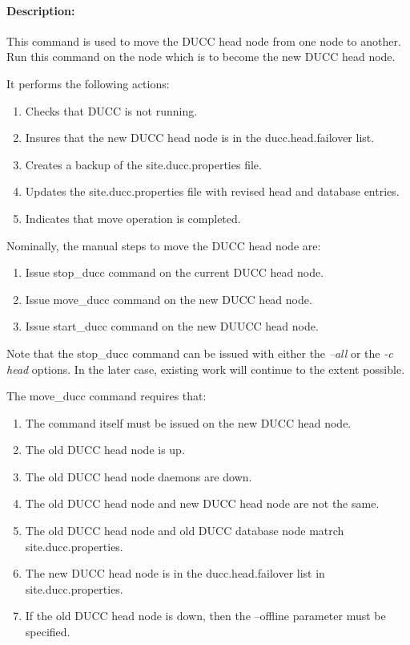     \paragraph{Description:}
        This command is used to move the DUCC head node from one node to another.
        Run this command on the node which is to become the new DUCC head node.

        It performs the following actions:
        \begin{enumerate}
          \item Checks that DUCC is not running.
          \item Insures that the new DUCC head node is in the ducc.head.failover list.
          \item Creates a backup of the site.ducc.properties file.
          \item Updates the site.ducc.properties file with revised head and database entries.
          \item Indicates that move operation is completed.
        \end{enumerate}

        Nominally, the manual steps to move the DUCC head node are:
        \begin{enumerate}
          \item Issue stop\_ducc command on the current DUCC head node.
          \item Issue move\_ducc command on the new DUCC head node.
          \item Issue start\_ducc command on the new DUUCC head node.
        \end{enumerate}

        Note that the stop\_ducc command can be issued with either the 
        {\em --all}
        or the 
        {\em -c head}
        options.
        In the later case, existing work will continue to the extent possible.
               
        The move\_ducc command requires that:
        \begin{enumerate}
          \item The command itself must be issued on the new DUCC head node.
          \item The old DUCC head node is up.
          \item The old DUCC head node daemons are down.
          \item The old DUCC head node and new DUCC head node are not the same.
          \item The old DUCC head node and old DUCC database node matrch site.ducc.properties.
          \item The new DUCC head node is in the ducc.head.failover list in site.ducc.properties.
          \item If the old DUCC head node is down, then the --offline parameter must be specified.
        \end{enumerate}
       
